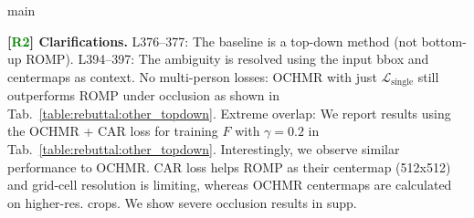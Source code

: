 main\documentclass[10pt,twocolumn,letterpaper]{article}
\newcommand{\Rtwo}{\textcolor{Green}{R2}}
\begin{document}
\vspace{1.0mm}\noindent
\textbf{[\Rtwo] Clarifications.} L376--377: The baseline is a top-down method (not bottom-up ROMP). L394--397: The ambiguity is resolved using the input bbox and centermaps as context. No multi-person losses: OCHMR with just $\mathcal{L}_{\text{single}}$ still outperforms ROMP under occlusion as shown in Tab.~\ref{table:rebuttal:other_topdown}. Extreme overlap: We report results using the OCHMR + CAR loss for training $F$ with $\gamma = 0.2$ in Tab.~\ref{table:rebuttal:other_topdown}. Interestingly, we observe similar performance to OCHMR. CAR loss helps ROMP as their centermap (512x512) and grid-cell resolution is limiting, whereas OCHMR centermaps are calculated on higher-res. crops. We show severe occlusion results in supp. 


\begin{table}[t]
\captionsetup{font=scriptsize}
\begin{center}
\vspace*{-0.1in}
\vspace*{-0.1in}
\caption{OCHMR with top-down methods and losses. Metrics are MPJPE/AP.}
 \vspace*{-0.4in}
\label{table:rebuttal:other_topdown}
\end{center}
\end{table}
 
\end{document}

